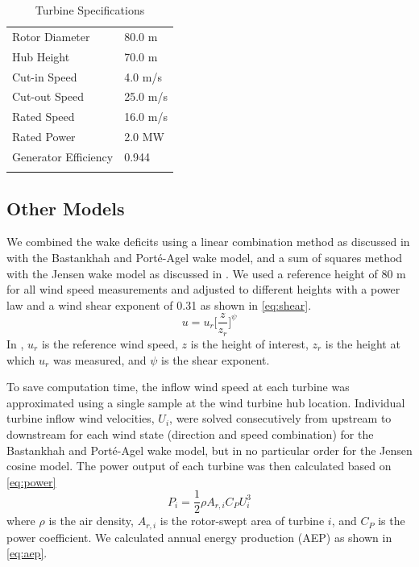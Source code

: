 \documentclass[a4paper]{jpconf}
\begin{document}
%
\begin{table}
	\caption{Turbine Specifications}
	\label{tab:v80}
	\centering
	\begin{tabular}{l l}
		\br
		Rotor Diameter & 80.0 m\\
		Hub Height & 70.0 m \\
		Cut-in Speed & 4.0 m/s\\
		Cut-out Speed & 25.0 m/s \\
		Rated Speed & 16.0 m/s \\
		Rated Power & 2.0 MW \\
		Generator Efficiency & 0.944 \\
		\br
	\end{tabular}
\end{table}

\subsection{Other Models}
We combined the wake deficits using a linear combination method as discussed in \cite{niayifar2016} with the Bastankhah and Port\'e-Agel wake model, and a sum of squares method with the Jensen wake model as discussed in \cite{katic1986}. We used a reference height of 80 m for all wind speed measurements and adjusted to different heights with a power law and a wind shear exponent of 0.31 as shown in \cref{eq:shear}. 
%
\begin{equation} \label{eq:shear}
u = u_r\bigg[\frac{z}{z_r}\bigg]^\psi
\end{equation}
%
In , $u_r$ is the reference wind speed, $z$ is the height of interest, $z_r$ is the height at which $u_r$ was measured, and $\psi$ is the shear exponent.

To save computation time, the inflow wind speed at each turbine was approximated using a single sample at the wind turbine hub location. Individual turbine inflow wind velocities, $U_i$, were solved consecutively from upstream to downstream for each wind state (direction and speed combination) for the Bastankhah and Port\'e-Agel wake model, but in no particular order for the Jensen cosine model. The power output of each turbine was then calculated based on \cref{eq:power}
%
\begin{equation}\label{eq:power}
P_i = \frac{1}{2}\rho A_{r,i}C_P U_i^3
\end{equation}
%
where $\rho$ is the air density, $A_{r,i}$ is the rotor-swept area of turbine $i$, and $C_P$ is the power coefficient. We calculated annual energy production (AEP) as shown in \cref{eq:aep}.
\end{document}
